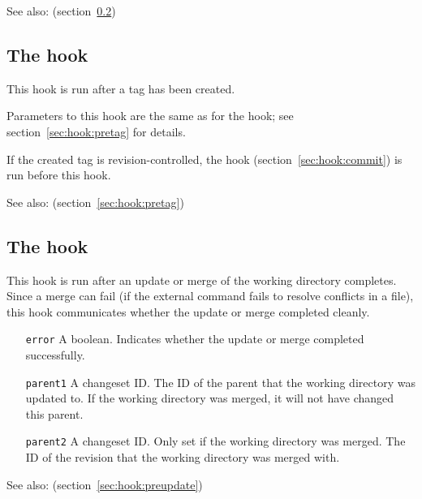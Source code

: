 See also:  (section~\ref{sec:hook:update})

\subsection{The  hook}
\label{sec:hook:tag}

This hook is run after a tag has been created.

Parameters to this hook are the same as for the  hook;
see section~\ref{sec:hook:pretag} for details.

If the created tag is revision-controlled, the  hook
(section~\ref{sec:hook:commit}) is run before this hook.

See also:  (section~\ref{sec:hook:pretag})

\subsection{The  hook}
\label{sec:hook:update}

This hook is run after an update or merge of the working directory
completes.  Since a merge can fail (if the external 
command fails to resolve conflicts in a file), this hook communicates
whether the update or merge completed cleanly.

\begin{itemize}
\item[\texttt{error}] A boolean.  Indicates whether the update or
  merge completed successfully.
\item[\texttt{parent1}] A changeset ID.  The ID of the parent that the
  working directory was updated to.  If the working directory was
  merged, it will not have changed this parent.
\item[\texttt{parent2}] A changeset ID.  Only set if the working
  directory was merged.  The ID of the revision that the working
  directory was merged with.
\end{itemize}

See also:  (section~\ref{sec:hook:preupdate})

